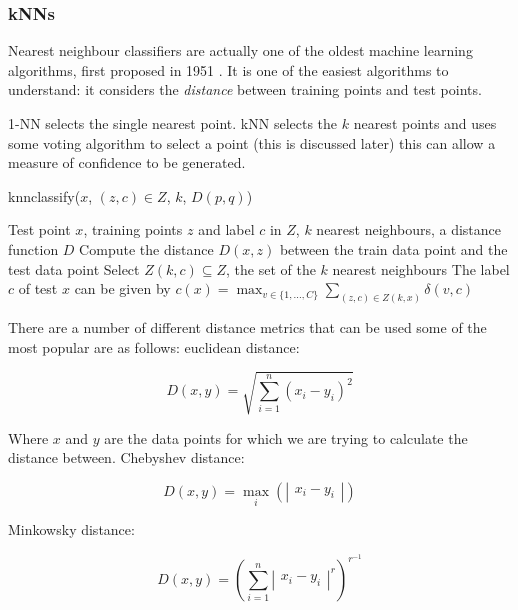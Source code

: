 \documentclass{article}
\begin{document}
\begin{multicols}{2}
\subsubsection{kNNs}
Nearest neighbour classifiers are actually one of the oldest machine learning algorithms, first proposed in 1951 \citep{hodges}. It is one of the easiest algorithms to understand: it considers the \textit{distance} between training points and test points.

1-NN selects the single nearest point. kNN selects the $k$ nearest points and uses some voting algorithm to select a point (this is discussed later) this can allow a measure of confidence to be generated.

\begin{algorithm}[H]
	\caption{knnclassify($x$, $(z,c) \in Z$, $k$, $D(p,q)$)}
	\label{alg:knn}
		\begin{algorithmic}[1]
			\Require Test point $x$, training points $z$ and label $c$ in $Z$, $k$ nearest neighbours, a distance function $D$
				\State Compute the distance $D(x, z)$ between the train data point and the test data point
				\State Select $Z(k, c) \subseteq Z$, the set of the $k$ nearest neighbours
			\EndFor
			\State The label $c$ of test $x$ can be given by $c(x) = \max_{v \in \{1,...,C \}} \sum_{(z, c) \in Z(k, x)} \delta(v, c)$
		\end{algorithmic}
\end{algorithm} 

There are a number of different distance metrics that can be used some of the most popular are as follows: euclidean distance:

\begin{equation}
	D\left( x,y\right) = \sqrt {\sum _{i=1}^{n}  \left( x_{i}-y_{i}\right)^2 }
\end{equation}

Where $x$ and $y$ are the data points for which we are trying to calculate the distance between. Chebyshev distance:

\begin{equation}
	D\left( x,y\right) =  \max _{i} ( \left| \begin{matrix} x_{i} -y_{i}\end{matrix} \right|   )
\end{equation}

Minkowsky distance:

\begin{equation}
	D\left( x,y\right) =  ( \sum _{i=1}^{n}  \left| \begin{matrix} x_{i} -y_{i}\end{matrix} \right|^{r}   )^{r^{-1}}
\end{equation}


\end{multicols}
\end{document}
